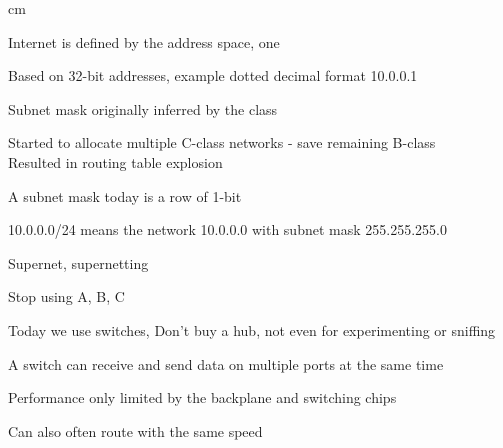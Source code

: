 \documentclass[Screen16to9,17pt]{foils}
\begin{document}

 cm

\begin{list2}
\item Internet is defined by the address space, one
\item Based on 32-bit addresses, example dotted decimal format 10.0.0.1
\end{list2}




\begin{list2}
\item Subnet mask originally inferred by the class
\item Started to allocate multiple C-class networks - save remaining B-class\\
Resulted in routing table explosion
\item A subnet mask today is a row of 1-bit
\item 10.0.0.0/24 means the network 10.0.0.0 with subnet mask 255.255.255.0
\item Supernet, supernetting
\item Stop using A, B, C
\end{list2}






\begin{list1}
\item Today we use switches, Don't buy a hub, not even for experimenting or sniffing
\item A switch can receive and send data on multiple ports at the same time
\item Performance only limited by the backplane and switching chips
\item Can also often route with the same speed
\end{list1}


\end{document}
